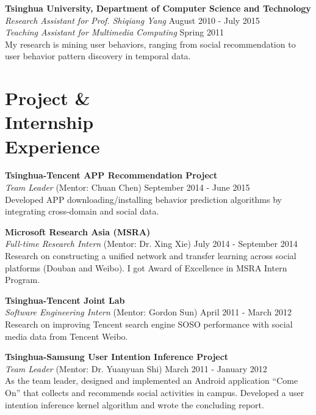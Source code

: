 \documentclass[margin, 10pt]{res} %
\begin{document}
\begin{resume}
{\bf Tsinghua University, Department of Computer Science and Technology} \\
{\em Research Assistant for Prof. Shiqiang Yang} \hfill {August 2010 - July 2015} \\
{\em Teaching Assistant for Multimedia Computing} \hfill {Spring 2011} \\
My research is mining user behaviors, ranging from social recommendation to user behavior pattern discovery in temporal data.


\section{Project \& \\ Internship \\ Experience}

{\bf Tsinghua-Tencent APP Recommendation Project} \\
{\em Team Leader} (Mentor: Chuan Chen) \hfill {September 2014 - June 2015} \\
Developed APP downloading/installing behavior prediction algorithms by integrating cross-domain and social data.

{\bf Microsoft Research Asia (MSRA)} \\
{\em Full-time Research Intern} (Mentor: Dr. Xing Xie) \hfill {July 2014 - September 2014} \\
Research on constructing a unified network and transfer learning across social platforms (Douban and Weibo).
I got Award of Excellence in MSRA Intern Program.

{\bf Tsinghua-Tencent Joint Lab} \\
{\em Software Engineering Intern} (Mentor: Gordon Sun) \hfill {April 2011 - March 2012} \\
Research on improving Tencent search engine SOSO performance with social media data from Tencent Weibo.

{\bf Tsinghua-Samsung User Intention Inference Project} \\
{\em Team Leader} (Mentor: Dr. Yuanyuan Shi) \hfill {March 2011 - January 2012} \\
As the team leader, designed and implemented an Android application ``Come On'' that collects and recommends social activities in campus.
Developed a user intention inference kernel algorithm and wrote the concluding report.


\end{resume}
\end{document}
